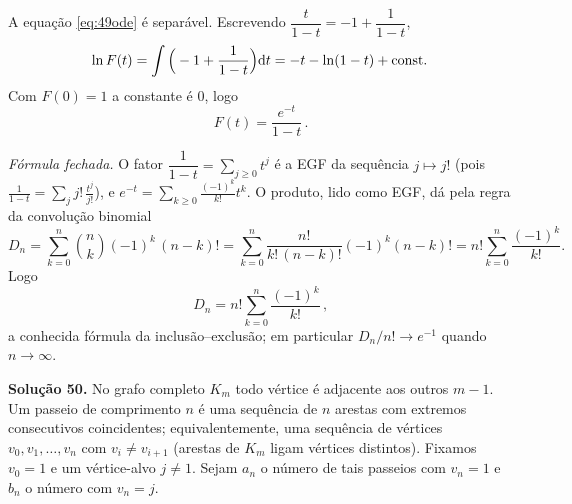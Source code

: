 \begin{enumerate}[label=(\alph*)]
A equação \eqref{eq:49ode} é separável. Escrevendo $\dfrac{t}{1-t}=-1+\dfrac{1}{1-t}$,
\[
\ln F(t)=\int\Big(-1+\frac1{1-t}\Big)\mathrm{d} t=-t-\ln(1-t)+\text{const}.
\]
Com $F(0)=1$ a constante é $0$, logo
\[
\boxed{\,F(t)=\frac{e^{-t}}{1-t}\,}.
\]

\emph{Fórmula fechada.} O fator $\dfrac{1}{1-t}=\sum_{j\ge0}t^j$ é a EGF da sequência $j\mapsto j!$ (pois $\frac{1}{1-t}=\sum_j j!\,\frac{t^j}{j!}$), e $e^{-t}=\sum_{k\ge0}\frac{(-1)^k}{k!}t^k$. O produto, lido como EGF, dá pela regra da convolução binomial
\[
D_n=\sum_{k=0}^n\binom{n}{k}(-1)^k\,(n-k)!=\sum_{k=0}^n\frac{n!}{k!\,(n-k)!}(-1)^k(n-k)!=n!\sum_{k=0}^n\frac{(-1)^k}{k!}.
\]
Logo
\[
\boxed{\,D_n=n!\sum_{k=0}^n\frac{(-1)^k}{k!}\,},
\]
a conhecida fórmula da inclusão–exclusão; em particular $D_n/n!\to e^{-1}$ quando $n\to\infty$.

\end{enumerate}


\bigskip\noindent\textbf{Solução 50.}\quad
No grafo completo $K_m$ todo vértice é adjacente aos outros $m-1$. Um passeio de comprimento $n$ é uma sequência de $n$ arestas com extremos consecutivos coincidentes; equivalentemente, uma sequência de vértices $v_0,v_1,\dots,v_n$ com $v_i\neq v_{i+1}$ (arestas de $K_m$ ligam vértices distintos). Fixamos $v_0=1$ e um vértice-alvo $j\neq1$. Sejam $a_n$ o número de tais passeios com $v_n=1$ e $b_n$ o número com $v_n=j$.

